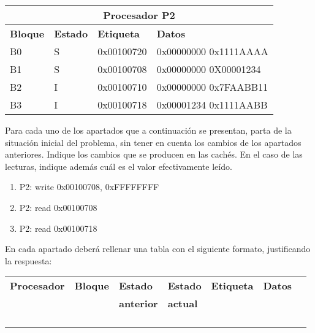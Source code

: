\begin{tabular}{|l|l|l|l|}
\hline
\multicolumn{4}{|c|}{Procesador P2}\\
\hline
\textbf{Bloque} &
\textbf{Estado} &
\textbf{Etiqueta} &
\textbf{Datos}
\\
\hline
\hline

B0 & S & 0x00100720 & 0x00000000 0x1111AAAA\\
\hline
B1 & S & 0x00100708 & 0x00000000 0X00001234\\
\hline
B2 & I & 0x00100710 & 0x00000000 0x7FAABB11\\
\hline
B3 & I & 0x00100718 & 0x00001234 0x1111AABB\\
\hline

\end{tabular}

\medskip

Para cada uno de los apartados que a continuación se presentan, parta de la
situación inicial del problema, sin tener en cuenta los cambios de los
apartados anteriores. Indique los cambios que se producen en las cachés. En el
caso de las lecturas, indique además cuál es el valor efectivamente leído.

\begin{enumerate}
  \item P2: write 0x00100708, 0xFFFFFFFF
  \item P2: read 0x00100708
  \item P2: read 0x00100718
\end{enumerate}

En cada apartado deberá rellenar una tabla con el siguiente formato,
justificando la respuesta: 

\begin{tabular}{|l|l|l|l|l|l|p{2cm}|p{2cm}|}

\hline
\textbf{Procesador} &
\textbf{Bloque} &
\textbf{Estado} &
\textbf{Estado} &
\textbf{Etiqueta} &
\multicolumn{2}{|c|}{\textbf{Datos}}
\\

&
&
\textbf{anterior} &
\textbf{actual} &
&
\multicolumn{2}{|c|}{}
\\
\hline
\hline

& & & & & \multicolumn{1}{|p{2cm}|}{} & \\
\hline
& & & & & \multicolumn{1}{|p{2cm}|}{} & \\
\hline
& & & & & \multicolumn{1}{|p{2cm}|}{} & \\
\hline
& & & & & \multicolumn{1}{|p{2cm}|}{} & \\
\hline
\end{tabular}

